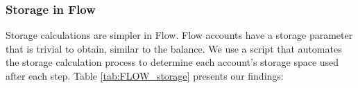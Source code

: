 \documentclass[../NFTComp_IEEE.tex]{subfiles}
\begin{document}
\subsubsection{Storage in Flow}
Storage calculations are simpler in Flow. Flow accounts have a storage parameter that is trivial to obtain, similar to the balance. We use a script that automates the storage calculation process to determine each account's storage space used after each step. Table \ref{tab:FLOW_storage} presents our findings:

\begin{table}[ht]
    \centering
    \caption{FLOW token balance of each account in the exercise}
    \vspace{0.1cm}
    \label{tab:FLOW_storage}
\end{table}
\end{document}
